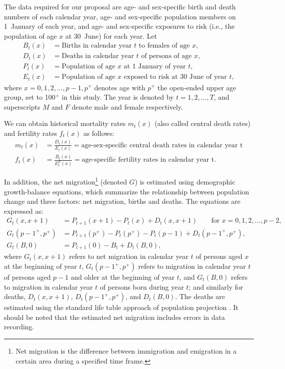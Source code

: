 \documentclass[
  doublespace]{anzsauth}
\begin{document}
The data required for our proposal are age- and sex-specific birth and death numbers of each calendar year, age- and sex-specific population members on 1~January of each year, and age- and sex-specific exposures to risk (i.e., the population of age \(x\) at 30~June) for each year. Let
\begin{align*}
  B_t(x) &= \text{Births in calendar year $t$ to females of age $x$},\\
  D_t(x) &= \text{Deaths in calendar year $t$ of persons of age $x$},\\
  P_t(x) &= \text{Population of age $x$ at 1 January of year $t$},\\
  E_t(x) &= \text{Population of age $x$ exposed to risk at 30 June of year $t$},
\end{align*}
where \(x=0,1,2,\dots,p-1,p^+\) denotes age with \(p^+\) the open-ended upper age group, set to 100\(^+\) in this study. The year is denoted by \(t=1,2,\dots,T\), and superscripts \(M\) and \(F\) denote male and female respectively.

We can obtain historical mortality rates \(m_t(x)\) (also called central death rates) and fertility rates \(f_t(x)\) as follows:
\begin{align*}
  m_t(x) & = \frac{D_t(x)}{E_t(x)}=\text{age-sex-specific central death rates in calendar year t}\\
  f_t(x) & = \frac{B_t(x)}{E^F_t(x)}=\text{age-specific fertility rates in calendar year t}.
\end{align*}

In addition, the net migration\footnote{Net migration is the difference between immigration and emigration in a certain area during a specified time frame.} (denoted \(G\)) is estimated using demographic growth-balance equations, which summarize the relationship between population change and three factors: net migration, births and deaths. The equations are expressed as:
\begin{align*}
  G_t(x,x+1)     & =P_{t+1}(x+1)-P_t(x)+D_t(x,x+1)\qquad\text{for $x=0,1,2,\dots,p-2$},\\
  G_t(p-1^+,p^+) & =P_{t+1}(p^+)-P_t(p^+)-P_t(p-1)+D_t(p-1^+,p^+),\\
  G_t(B,0)       & =P_{t+1}(0)-B_t+D_t(B,0),
\end{align*}
where \(G_t(x,x+1)\) refers to net migration in calendar year \(t\) of persons aged \(x\) at the beginning of year \(t\), \(G_t(p-1^+,p^+)\) refers to migration in calendar year \(t\) of persons aged \(p-1\) and older at the beginning of year \(t\), and \(G_t(B,0)\) refers to migration in calendar year \(t\) of persons born during year \(t\); and similarly for deaths, \(D_t(x,x+1)\), \(D_t(p-1^+,p^+)\), and \(D_t(B,0)\). The deaths are estimated using the standard life table approach of population projection \citep{Preston2001}. It should be noted that the estimated net migration includes errors in data recording.
\end{document}
